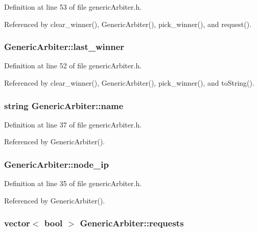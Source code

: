 Definition at line 53 of file genericArbiter.h.

Referenced by clear\_\-winner(), GenericArbiter(), pick\_\-winner(), and request().
\subsubsection[{last\_\-winner}]{ {\bf GenericArbiter::last\_\-winner}\hspace{0.3cm}{\tt  [private]}}\label{classGenericArbiter_531eb0c84fe9433d923f0d73da3aab24}




Definition at line 52 of file genericArbiter.h.

Referenced by clear\_\-winner(), GenericArbiter(), pick\_\-winner(), and toString().
\subsubsection[{name}]{\setlength{\rightskip}{0pt plus 5cm}string {\bf GenericArbiter::name}}\label{classGenericArbiter_d58995bf70e8e6b7422ab4e7bd97e360}




Definition at line 37 of file genericArbiter.h.

Referenced by GenericArbiter().
\subsubsection[{node\_\-ip}]{ {\bf GenericArbiter::node\_\-ip}}\label{classGenericArbiter_970eebd92edf4b43bd34dbe378aee0b4}




Definition at line 35 of file genericArbiter.h.

Referenced by GenericArbiter().
\subsubsection[{requests}]{\setlength{\rightskip}{0pt plus 5cm}vector$<$ bool $>$ {\bf GenericArbiter::requests}\hspace{0.3cm}{\tt  [private]}}\label{classGenericArbiter_11d312f8174346c263f24a3795d3d813}





